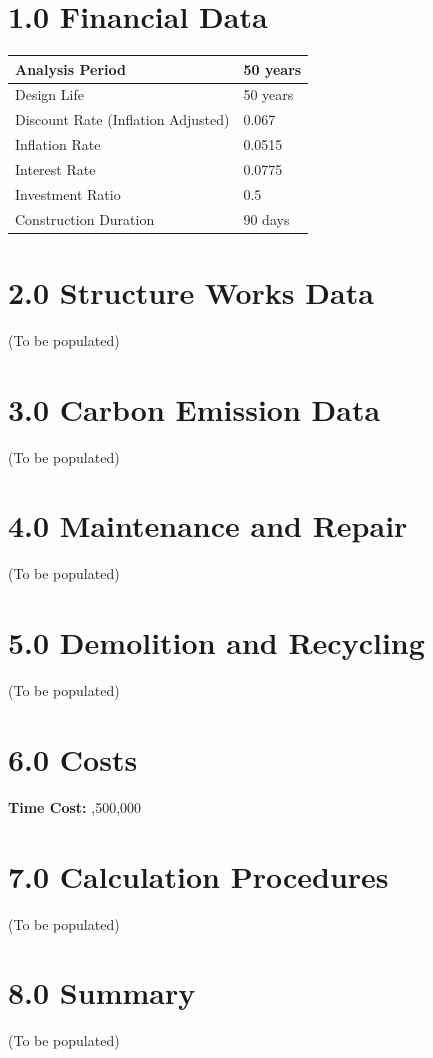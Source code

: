 \documentclass{article}
\begin{document}
\thispagestyle{fancy}

\vspace*{0.6cm}

\section*{1.0 Financial Data}
\begin{tabularx}{\linewidth}{|l|X|}
\hline
Analysis Period & 50 years \\ \hline
Design Life & 50 years \\ \hline
Discount Rate (Inflation Adjusted) & 0.067 \\ \hline
Inflation Rate & 0.0515 \\ \hline
Interest Rate & 0.0775 \\ \hline
Investment Ratio & 0.5 \\ \hline
Construction Duration & 90 days \\ \hline
\end{tabularx}

\vspace{0.4cm}

\section*{2.0 Structure Works Data}
(To be populated)

\section*{3.0 Carbon Emission Data}
(To be populated)

\section*{4.0 Maintenance and Repair}
(To be populated)

\section*{5.0 Demolition and Recycling}
(To be populated)

\section*{6.0 Costs}
\textbf{Time Cost:} ,500,000 %

\newpage
\vspace*{0.6cm}

\section*{7.0 Calculation Procedures}
(To be populated)

\section*{8.0 Summary}
(To be populated)
\end{document}
